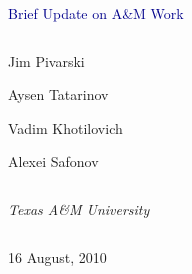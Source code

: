 \documentclass[compress]{beamer}
\begin{document}
\begin{frame}
\vfill
\begin{center}
\textcolor{darkblue}{\Large Brief Update on A\&M Work}

\vfill
\begin{columns}
\begin{center}
\large
Jim Pivarski

Aysen Tatarinov

Vadim Khotilovich

Alexei Safonov
\end{center}
\end{columns}

\begin{columns}
\begin{center}
\scriptsize
{\it Texas A\&M University}
\end{center}
\end{columns}

\vfill
16 August, 2010

\end{center}
\end{frame}


\small
\end{document}
